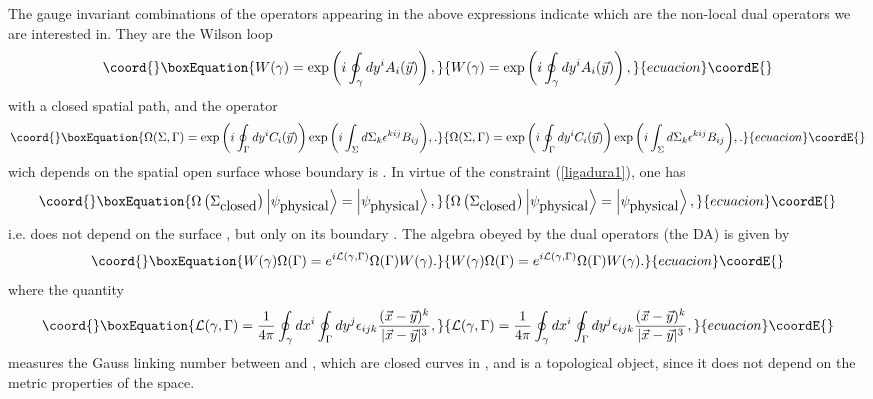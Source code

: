 \documentclass[a4paper,12pt]{article}
\providecommand{\ket}[1]{\left|#1\right\rangle}
\providecommand{\eref}[1]{(\ref{#1})}
\begin{document}
The gauge invariant combinations of the operators appearing in the above
expressions indicate which are the non-local dual operators we are interested
in. They are the Wilson loop
\begin{equation}\coord{}\boxEquation{
W(\gamma)=\exp\left(i\oint_\gamma dy^iA_i(\vec y)\right),\label{WL-Maxwell}
}{
W(\gamma)=\exp\left(i\oint_\gamma dy^iA_i(\vec y)\right),}{ecuacion}\coordE{}\end{equation}
with \myHighlight{$\gamma$}\coordHE{} a closed spatial path, and the operator
\begin{equation}\coord{}\boxEquation{
\Omega(\Sigma,\Gamma)=\exp{\left(i\oint_\Gamma dy^iC_i(\vec y)\right)}
\exp{\left(i\int_\Sigma d\Sigma_k\epsilon^{kij}B_{ij}\right)},
\label{WD-Maxwell}.
}{
\Omega(\Sigma,\Gamma)=\exp{\left(i\oint_\Gamma dy^iC_i(\vec y)\right)}
\exp{\left(i\int_\Sigma d\Sigma_k\epsilon^{kij}B_{ij}\right)},
.
}{ecuacion}\coordE{}\end{equation}
wich depends on the spatial open surface \myHighlight{$\Sigma$}\coordHE{} whose boundary is
\myHighlight{$\Gamma$}\coordHE{}. In virtue of the constraint \eref{ligadura1}, one has
\begin{equation}\coord{}\boxEquation{
\Omega\left(\Sigma_{\hbox{closed}}\right)\ket{\psi_{\hbox{physical}}}=
\ket{\psi_{\hbox{physical}}},
}{
\Omega\left(\Sigma_{\hbox{closed}}\right)\ket{\psi_{\hbox{physical}}}=
\ket{\psi_{\hbox{physical}}},
}{ecuacion}\coordE{}\end{equation}
i.e. \myHighlight{$\Omega$}\coordHE{} does not depend on the surface \myHighlight{$\Sigma$}\coordHE{}, but only on its
boundary \myHighlight{$\Gamma$}\coordHE{}. The algebra obeyed by the dual operators (the DA) is
given by
\begin{equation}\coord{}\boxEquation{
W(\gamma)\Omega(\Gamma)=e^{i{\cal L}(\gamma,\Gamma)}
\Omega(\Gamma)W(\gamma).\label{AlgDual}
}{
W(\gamma)\Omega(\Gamma)=e^{i{\cal L}(\gamma,\Gamma)}
\Omega(\Gamma)W(\gamma).}{ecuacion}\coordE{}\end{equation}
where the quantity
\begin{equation}\coord{}\boxEquation{
{\cal L}(\gamma,\Gamma)=\frac 1{4\pi}\oint_\gamma dx^i\oint_\Gamma
dy^j\epsilon_{ijk}\frac{(\vec x-\vec y)^k}{|\vec x-\vec y|^3},
}{
{\cal L}(\gamma,\Gamma)=\frac 1{4\pi}\oint_\gamma dx^i\oint_\Gamma
dy^j\epsilon_{ijk}\frac{(\vec x-\vec y)^k}{|\vec x-\vec y|^3},
}{ecuacion}\coordE{}\end{equation}
measures the Gauss linking number between \myHighlight{$\gamma$}\coordHE{} and \myHighlight{$\Gamma$}\coordHE{},
which are closed curves in \coordHE{}, and is a topological object, since
it does not depend on the metric properties of the space.
\end{document}
